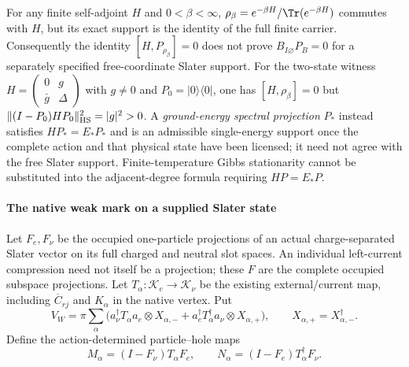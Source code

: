 \documentclass[12pt,a4paper]{article}
\begin{document}
\begin{remark}
\label{p4:rem:v239-gibbs-support-scope}
For any finite self-adjoint $H$ and $0<\beta<\infty$,
$\rho_\beta=e^{-\beta H}/\Tr(e^{-\beta H})$ commutes with $H$,
but its exact support is the identity of the full finite carrier.
Consequently the identity $[H,P_{\rho_\beta}]=0$ does not prove
$B_{I\varnothing}P_B=0$ for a separately specified free-coordinate
Slater support. For the two-state witness
$H=\left(\begin{smallmatrix}0&g\\\bar g&\Delta\end{smallmatrix}\right)$
with $g\ne0$ and $P_0=|0\rangle\langle0|$, one has
$[H,\rho_\beta]=0$ but
$\|(I-P_0)HP_0\|_{\rm HS}^2=|g|^2>0$.
A \emph{ground-energy spectral projection} $P_*$ instead satisfies
$HP_*=E_*P_*$ and is an admissible single-energy support once the
complete action and that physical state have been licensed; it need
not agree with the free Slater support. Finite-temperature Gibbs
stationarity cannot be substituted into the adjacent-degree formula
requiring $HP=E_*P$.
\end{remark}

\paragraph{The native weak mark on a supplied Slater state}
Let $F_e,F_\nu$ be the occupied one-particle projections of an actual
charge-separated Slater vector on its full charged and neutral slot spaces.
An individual left-current compression need not itself be a projection;
these $F$ are the complete occupied subspace projections. Let
$T_\alpha:\mathcal K_e\to\mathcal K_\nu$ be the existing external/current
map, including $\overline C_{rj}$ and $K_\alpha$ in the native vertex. Put
\begin{equation}
 V_W=\pi\sum_\alpha
   \bigl(a_\nu^\dagger T_\alpha a_e\otimes X_{\alpha,-}
        +a_e^\dagger T_\alpha^\dagger a_\nu\otimes X_{\alpha,+}\bigr),
 \qquad X_{\alpha,+}=X_{\alpha,-}^\dagger.
 \label{p4:eq:v2169-b11-l5}
\end{equation}
Define the action-determined particle--hole maps
\[
 M_\alpha=(I-F_\nu)T_\alpha F_e,\qquad
 N_\alpha=(I-F_e)T_\alpha^\dagger F_\nu .
\]
\end{document}
